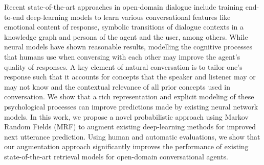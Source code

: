 Recent state-of-the-art approaches in open-domain dialogue include training end-to-end deep-learning models to learn various conversational features like emotional content of response, symbolic transitions of dialogue contexts in a knowledge graph and persona of the agent and the user, among others. While neural models have shown reasonable results, modelling the cognitive processes that humans use when conversing with each other may improve the agent's quality of responses. A key element of natural conversation is to tailor one's response such that it accounts for concepts that the speaker and listener may or may not know and the contextual relevance of all prior concepts used in conversation. We show that a rich representation and explicit modeling of these psychological processes can improve predictions made by existing neural network models. In this work, we propose a novel probabilistic approach using Markov Random Fields (MRF) to augment existing deep-learning methods for improved next utterance prediction. Using human and automatic evaluations, we show that our augmentation approach significantly improves the performance of existing state-of-the-art retrieval models for open-domain conversational agents.
